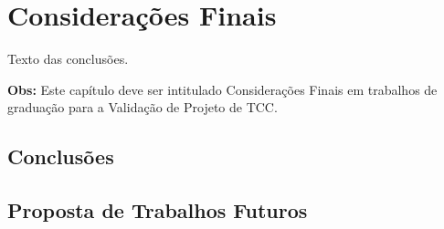 \chapter{Considerações Finais}
\label{cap:05}

Texto das conclusões.

\textbf{Obs:} Este capítulo deve ser intitulado Considerações Finais em trabalhos de graduação para a Validação de Projeto de TCC. 

\section{Conclusões}

\section{Proposta de Trabalhos Futuros}